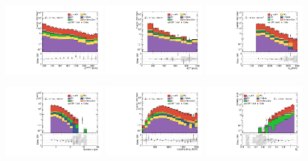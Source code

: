 \begin{figure}[ht!]
  \begin{center}

    \includegraphics[width=0.32\textwidth]{images_tmp/results/fr2/can_CRQ_ph_pt0_afterFit.pdf}
    \includegraphics[width=0.32\textwidth]{images_tmp/results/fr2/can_CRQ_met_et_afterFit.pdf}
    \includegraphics[width=0.32\textwidth]{images_tmp/results/fr2/can_CRQ_meff_afterFit.pdf}

    \includegraphics[width=0.32\textwidth]{images_tmp/results/fr2/can_CRQ_jet_n_afterFit}
    \includegraphics[width=0.32\textwidth]{images_tmp/results/fr2/can_CRQ_jet_pt0_afterFit.pdf}
    \includegraphics[width=0.32\textwidth]{images_tmp/results/fr2/can_CRQ_rt4_afterFit}


\end{center}
\end{figure}
